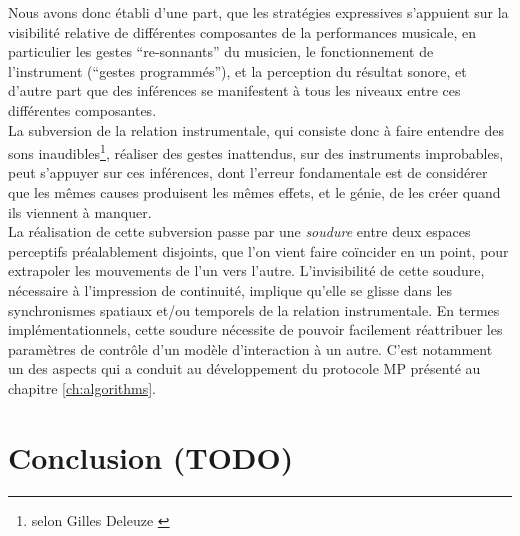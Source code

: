 \noindent Nous avons donc établi d'une part, que les stratégies expressives s'appuient sur la visibilité relative de différentes composantes de la performances musicale, en particulier les gestes ``re-sonnants'' du musicien, le fonctionnement de l'instrument (``gestes programmés''), et la perception du résultat sonore, et d'autre part que des inférences se manifestent à tous les niveaux entre ces différentes composantes.\\
\indent La subversion de la relation instrumentale, qui consiste donc à faire entendre des sons inaudibles\footnote{ selon Gilles Deleuze \cite{deleuze_francis_1981}}, réaliser des gestes inattendus, sur des instruments improbables, peut s'appuyer sur ces inférences, dont l'erreur fondamentale est de considérer que les mêmes causes produisent les mêmes effets, et le génie, de les créer quand ils viennent à manquer.\\
\indent La réalisation de cette subversion passe par une \textit{soudure} entre deux espaces perceptifs préalablement disjoints, que l'on vient faire coïncider en un point, pour extrapoler les mouvements de l'un vers l'autre. L'invisibilité de cette soudure, nécessaire à l'impression de continuité, implique qu'elle se glisse dans les synchronismes spatiaux et/ou temporels de la relation instrumentale.
En termes implémentationnels, cette soudure nécessite de pouvoir facilement réattribuer les paramètres de contrôle d'un modèle d'interaction à un autre. C'est notamment un des aspects qui a conduit au développement du protocole MP présenté au chapitre \ref{ch:algorithms}.

\section{Conclusion (TODO)}
\label{sec:gesture:conclusion}

